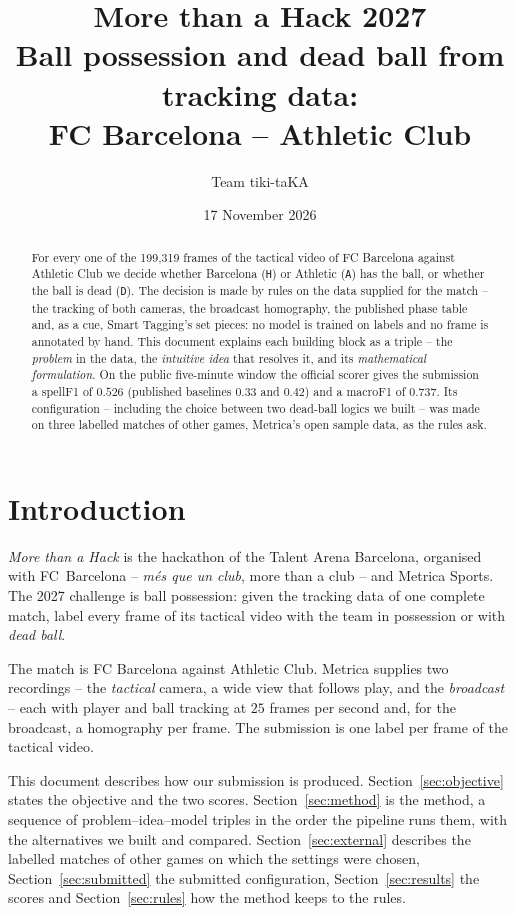 \documentclass[11pt,a4paper]{article}
\title{\textbf{More than a Hack 2027}\\[0.3em]
\large Ball possession and dead ball from tracking data:\\ FC Barcelona -- Athletic Club}
\author{Team tiki-taKA}
\date{17 November 2026}
\begin{document}
\maketitle

\begin{abstract}
\noindent
For every one of the 199{,}319 frames of the tactical video of FC Barcelona against Athletic
Club we decide whether Barcelona (\texttt{H}) or Athletic (\texttt{A}) has the ball, or
whether the ball is dead (\texttt{D}). The decision is made by rules on the data
supplied for the match -- the tracking of both cameras, the broadcast homography, the
published phase table and, as a cue, Smart Tagging's set pieces: no model
is trained on labels and no frame is annotated by hand. This document
explains each building block as a triple -- the \emph{problem} in the data, the
\emph{intuitive idea} that resolves it, and its \emph{mathematical formulation}. On the
public five-minute window the official scorer gives the submission a spellF1 of $0.526$
(published baselines $0.33$ and $0.42$) and a macroF1 of $0.737$. Its configuration -- including
the choice between two dead-ball logics we built -- was made on three labelled matches of other
games, Metrica's open sample data, as the rules ask.
\end{abstract}

\tableofcontents
\bigskip

\section{Introduction}

\emph{More than a Hack} is the hackathon of the Talent Arena Barcelona, organised with
FC~Barcelona -- \emph{m\'es que un club}, more than a club -- and Metrica Sports. The 2027
challenge is ball possession: given the tracking data of one complete match, label every
frame of its tactical video with the team in possession or with \emph{dead ball}.

The match is FC Barcelona against Athletic Club. Metrica supplies two recordings -- the
\emph{tactical} camera, a wide view that follows play, and the \emph{broadcast} -- each with
player and ball tracking at $25$ frames per second and, for the broadcast, a homography per
frame. The submission is one label per frame of the tactical video.

This document describes how our submission is produced. Section~\ref{sec:objective} states
the objective and the two scores. Section~\ref{sec:method} is the method, a sequence of
problem--idea--model triples in the order the pipeline runs them, with the alternatives we
built and compared. Section~\ref{sec:external} describes the labelled matches of other games on
which the settings were chosen, Section~\ref{sec:submitted} the submitted configuration,
Section~\ref{sec:results} the scores and Section~\ref{sec:rules} how the method keeps to the
rules.
\end{document}
